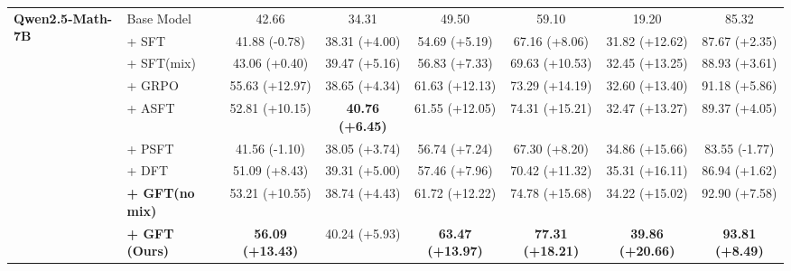 \begin{table}[!t]
{\begin{tabular}{llcccccc}
            \multirow{9}{*}{\textbf{Qwen2.5-Math-7B}} 
            & Base Model & 42.66 & 34.31 & 49.50 & 59.10 & 19.20 & 85.32 \\
            & + SFT & 41.88 (-0.78) & 38.31 (+4.00) & 54.69 (+5.19) & 67.16 (+8.06) & 31.82 (+12.62) & 87.67 (+2.35) \\
            & + SFT(mix) & 43.06 (+0.40) & 39.47 (+5.16) & 56.83 (+7.33) & 69.63 (+10.53) & 32.45 (+13.25) & 88.93 (+3.61) \\
            & + GRPO & 55.63 (+12.97) & 38.65 (+4.34) & 61.63 (+12.13) & 73.29 (+14.19) & 32.60 (+13.40) & 91.18 (+5.86) \\
            & + ASFT & 52.81 (+10.15) & \cellcolor{blue!10}\textbf{40.76 (+6.45)} & 61.55 (+12.05) & 74.31 (+15.21) & 32.47 (+13.27) & 89.37 (+4.05) \\
            & + PSFT & 41.56 (-1.10) & 38.05 (+3.74) & 56.74 (+7.24) & 67.30 (+8.20) & 34.86 (+15.66) & 83.55 (-1.77) \\
            & + DFT & 51.09 (+8.43) & 39.31 (+5.00) & 57.46 (+7.96) & 70.42 (+11.32) & 35.31 (+16.11) & 86.94 (+1.62) \\
            \cmidrule(l){2-8}
            & \textbf{+ GFT(no mix)} & 53.21 (+10.55) & 38.74 (+4.43) & 61.72 (+12.22) & 74.78 (+15.68) & 34.22 (+15.02) & 92.90 (+7.58) \\
            & \textbf{+ GFT (Ours)} & \cellcolor{blue!10}\textbf{56.09 (+13.43)} & 40.24 (+5.93) & \cellcolor{blue!10}\textbf{63.47 (+13.97)} & \cellcolor{blue!10}\textbf{77.31 (+18.21)} & \cellcolor{blue!10}\textbf{39.86 (+20.66)} & \cellcolor{blue!10}\textbf{93.81 (+8.49)} \\
            \midrule
              

\end{tabular}}
\end{table}
